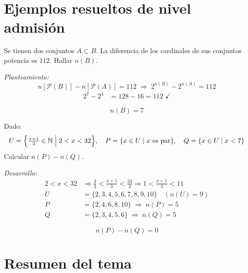 \section{Ejemplos resueltos de nivel admisi\'on}

\begin{cajaejemplo}
  Se tienen dos conjuntos $A \subset B$. La diferencia de los cardinales de
  sus conjuntos potencia es $112$. Hallar $n(B)$.

  \medskip
  \noindent\textit{Planteamiento:}
  \[
    n[\mathcal{P}(B)] - n[\mathcal{P}(A)] = 112
    \;\Longrightarrow\;
    2^{n(B)} - 2^{n(A)} = 112
  \]
  \begin{align*}
    2^{7} - 2^{4} &= 128 - 16 = 112 \;\checkmark
  \end{align*}
  \begin{tcolorbox}[colback=AzulClaro!50, colframe=AzulPizarra,
      arc=2pt, boxrule=0.7pt]
    \[ \boxed{n(B) = 7} \]
  \end{tcolorbox}
\end{cajaejemplo}

\begin{cajaejemplo}
  Dado:
  \[
    U = \Bigl\{\tfrac{x+1}{3} \in \mathbb{N} \;\Big|\; 2 < x < 32\Bigr\},
    \quad P = \{x \in U \mid x \text{ es par}\}, \quad
    Q = \{x \in U \mid x < 7\}
  \]
  Calcular $n(P) - n(Q)$.

  \noindent\textit{Desarrollo:}
  \begin{align*}
    2 < x < 32 &\Rightarrow \tfrac{3}{3} < \tfrac{x+1}{3} < \tfrac{33}{3}
                \Rightarrow 1 < \tfrac{x+1}{3} < 11 \\
    U &= \{2, 3, 4, 5, 6, 7, 8, 9, 10\} \quad (n(U)=9)\\
    P &= \{2, 4, 6, 8, 10\} \;\Rightarrow\; n(P) = 5 \\
    Q &= \{2, 3, 4, 5, 6\}  \;\Rightarrow\; n(Q) = 5
  \end{align*}
  \begin{tcolorbox}[colback=AzulClaro!50, colframe=AzulPizarra,
      arc=2pt, boxrule=0.7pt]
    \[ \boxed{n(P) - n(Q) = 0} \]
  \end{tcolorbox}
\end{cajaejemplo}

\section{Resumen del tema}

